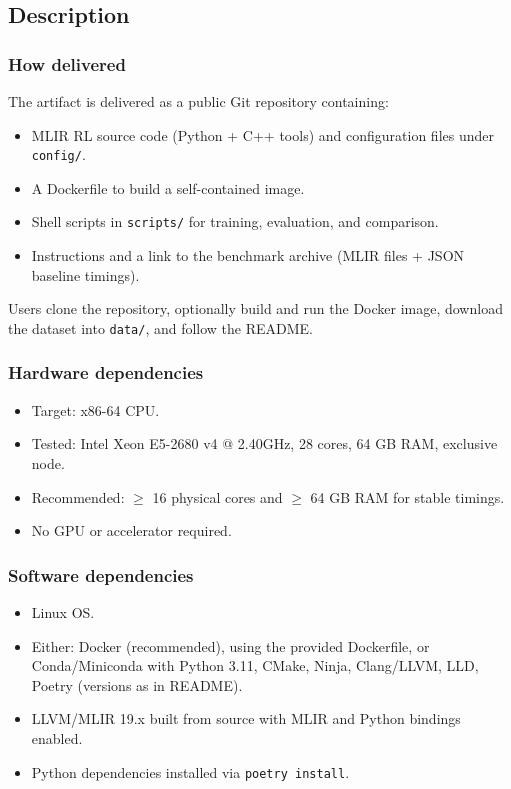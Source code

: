 \documentclass[10pt,twocolumn]{article}
\begin{document}
\subsection{Description}

\subsubsection{How delivered}
The artifact is delivered as a public Git repository containing:
\begin{itemize}
\item MLIR RL source code (Python + C++ tools) and configuration files under \texttt{config/}.
\item A Dockerfile to build a self-contained image.
\item Shell scripts in \texttt{scripts/} for training, evaluation, and comparison.
\item Instructions and a link to the benchmark archive (MLIR files + JSON baseline timings).
\end{itemize}
Users clone the repository, optionally build and run the Docker image, download the dataset into \texttt{data/}, and follow the README.

\subsubsection{Hardware dependencies}
\begin{itemize}
\item Target: x86-64 CPU.
\item Tested: Intel Xeon E5-2680 v4 @ 2.40GHz, 28 cores, 64 GB RAM, exclusive node.
\item Recommended: $\geq$ 16 physical cores and $\geq$ 64 GB RAM for stable timings.
\item No GPU or accelerator required.
\end{itemize}

\subsubsection{Software dependencies}
\begin{itemize}
\item Linux OS.
\item Either: Docker (recommended), using the provided Dockerfile, or Conda/Miniconda with Python 3.11, CMake, Ninja, Clang/LLVM, LLD, Poetry (versions as in README).
\item LLVM/MLIR 19.x built from source with MLIR and Python bindings enabled.
\item Python dependencies installed via \texttt{poetry install}.
\end{itemize}
\end{document}
